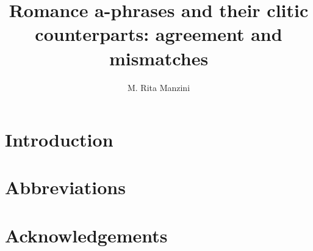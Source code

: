 \documentclass[output=paper]{langsci/langscibook}
\author{M. Rita Manzini\affiliation{}}
\title{Romance a-phrases and their clitic counterparts: agreement and mismatches}
\begin{document}
\section{Introduction}  
 
\section*{Abbreviations}
\section*{Acknowledgements}

\sloppy
\printbibliography[heading=subbibliography,notkeyword=this] 
\end{document}
